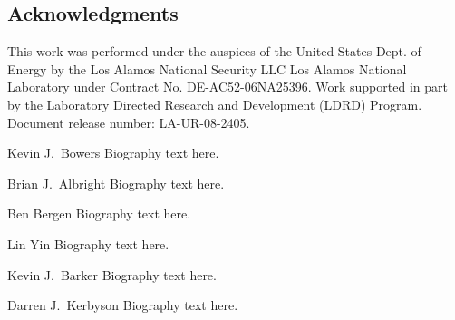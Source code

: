 \documentclass[journal,twoside]{IEEEtran}
\begin{document}
\subsection*{Acknowledgments}

This work was performed under the auspices of the United States Dept.
of Energy by the Los Alamos National Security LLC Los Alamos National
Laboratory under Contract No. DE-AC52-06NA25396.  Work supported in
part by the Laboratory Directed Research and Development (LDRD)
Program.  Document release number: LA-UR-08-2405.




\begin{IEEEbiographynophoto}{Kevin J.~Bowers}
Biography text here.
\end{IEEEbiographynophoto}

\begin{IEEEbiographynophoto}{Brian J.~Albright}
Biography text here.
\end{IEEEbiographynophoto}

\begin{IEEEbiographynophoto}{Ben Bergen}
Biography text here.
\end{IEEEbiographynophoto}

\begin{IEEEbiographynophoto}{Lin Yin}
Biography text here.
\end{IEEEbiographynophoto}

\begin{IEEEbiographynophoto}{Kevin J.~Barker}
Biography text here.
\end{IEEEbiographynophoto}

\begin{IEEEbiographynophoto}{Darren J.~Kerbyson}
Biography text here.
\end{IEEEbiographynophoto}
\end{document}
